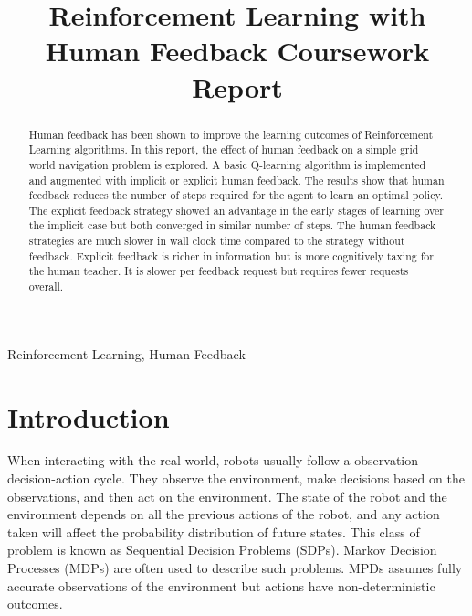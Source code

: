 \documentclass[conference]{IEEEtran}
\begin{document}
\title{Reinforcement Learning with Human Feedback Coursework Report}

\author{
}

\maketitle

\begin{abstract}
Human feedback has been shown to improve the learning outcomes of Reinforcement Learning algorithms. In this report, the effect of human feedback on a simple grid world navigation problem is explored. A basic Q-learning algorithm is implemented and augmented with implicit or explicit human feedback. The results show that human feedback reduces the number of steps required for the agent to learn an optimal policy. The explicit feedback strategy showed an advantage in the early stages of learning over the implicit case but both converged in similar number of steps. The human feedback strategies are much slower in wall clock time compared to the strategy without feedback. Explicit feedback is richer in information but is more cognitively taxing for the human teacher. It is slower per feedback request but requires fewer requests overall.
\end{abstract}

\begin{IEEEkeywords}
    Reinforcement Learning, Human Feedback
\end{IEEEkeywords}

\section{Introduction}

When interacting with the real world, robots usually follow a observation-decision-action cycle. They observe the environment, make decisions based on the observations, and then act on the environment. The state of the robot and the environment depends on all the previous actions of the robot, and any action taken will affect the probability distribution of future states. This class of problem is known as Sequential Decision Problems (SDPs). Markov Decision Processes (MDPs) \cite{putermanMarkovDecisionProcesses2014} are often used to describe such problems. MPDs assumes fully accurate observations of the environment but actions have non-deterministic outcomes.
\end{document}
